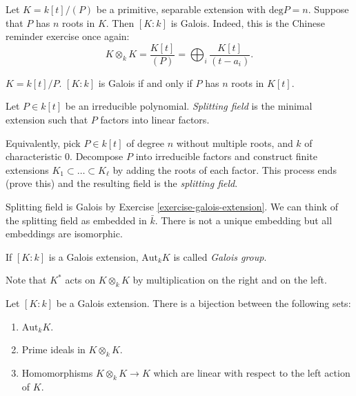 \begin{example}
\label{example-galois-extension}
Let $K=k[t]/(P)$
be a primitive, separable extension with
$\text{deg} P=n$.
Suppose that $P$ has $n$ roots in $K$.
Then $[K:k]$ is Galois.
Indeed, this is the Chinese reminder exercise
once again:
$$
K \otimes_k K = \frac{K[t]}{(P)}
=\bigoplus_i \frac{K[t]}{(t-a_i)}.
$$
\end{example}

\begin{exercise}
\label{exercise-galois-extension}
$K=k[t]/P$.
$[K:k]$ is Galois if and only if
$P$ has $n$ roots in $K[t]$.
\end{exercise}

\begin{definition}
\label{definition-splitting-field}
Let $P \in k[t]$
be an irreducible polynomial.
{\it Splitting field} is the minimal
extension
such that $P$ factors into linear factors.

Equivalently, pick $P \in k[t]$ of degree $n$
without multiple roots,
and $k$ of characteristic 0.
Decompose $P$ into irreducible factors and
construct finite extensions
$K_1\subset … \subset K_\ell$ by adding the
roots of each factor.
This process ends (prove this) and the
resulting field is
the {\it splitting field}.
\end{definition}

\noindent
Splitting field is Galois by Exercise
\ref{exercise-galois-extension}.
We can think of the splitting field as
embedded in $\bar{k}$.
There is not a unique embedding but all
embeddings are isomorphic.

\begin{definition}
\label{definition-galois-group}
If $[K:k]$ is a Galois extension,
$\text{Aut}_k K$ is called {\it Galois
group}.
\end{definition}

\noindent
Note that $K^*$ acts on $K \otimes_k K$ by
multiplication
on the right and on the left.

\begin{lemma}
\label{lemma-galois-group-and-extensions}
Let $[K:k]$ be a Galois extension.
There is a bijection between the following
sets:
\begin{enumerate}
\item $\text{Aut}_k K$.
\item Prime ideals in $K \otimes_k K$.
\item Homomorphisms $K \otimes_k K \to K$
which are linear with respect to the left
action of $K$.
\end{enumerate}
\end{lemma}

